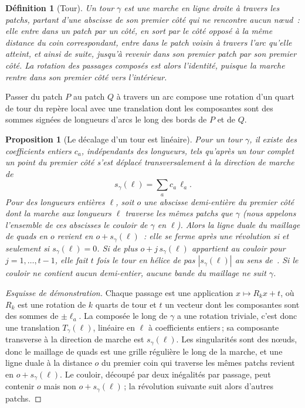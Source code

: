 \documentclass[11pt,a4paper]{article}
\newtheorem{definition}{Définition}
\newtheorem{proposition}{Proposition}
\newcommand{\shift}{s}
\begin{document}
\begin{definition}[Tour]
Un \emph{tour} $\gamma$ est une marche en ligne droite à travers les patchs,
partant d'une abscisse de son premier côté qui ne rencontre aucun nœud~: elle
entre dans un patch par un côté, en sort par le côté opposé à la même distance
du coin correspondant, entre dans le patch voisin à travers l'arc qu'elle
atteint, et ainsi de suite, jusqu'à revenir dans son premier patch par son
premier côté. La rotation des passages composés est alors l'identité,
puisque la marche rentre dans son premier côté vers l'intérieur.
\end{definition}

Passer du patch $P$ au patch $Q$ à travers un arc compose une rotation d'un
quart de tour du repère local avec une translation dont les composantes sont
des sommes signées de longueurs d'arcs le long des bords de $P$ et de $Q$.

\begin{proposition}[Le décalage d'un tour est linéaire]\label{prop:linear}
Pour un tour $\gamma$, il existe des coefficients entiers $c_a$, indépendants
des longueurs, tels qu'après un tour complet un point du premier côté s'est
déplacé transversalement à la direction de marche de
\[
  \shift_\gamma(\ell) = \sum_a c_a\, \ell_a .
\]
Pour des longueurs entières $\ell$, soit $o$ une abscisse demi-entière du
premier côté dont la marche aux longueurs $\ell$ traverse les mêmes patchs que
$\gamma$ (nous appelons l'ensemble de ces abscisses le \emph{couloir} de
$\gamma$ en $\ell$). Alors la ligne duale du maillage de quads en $o$ revient
en $o + \shift_\gamma(\ell)$~: elle se ferme après une révolution si et
seulement si $\shift_\gamma(\ell) = 0$. Si de plus $o + j\,\shift_\gamma(\ell)$
appartient au couloir pour $j = 1, \dots, t - 1$, elle fait $t$ fois le tour
en hélice de pas $|\shift_\gamma(\ell)|$ au sens
de~\cite{bommes2011structure}. Si le couloir ne contient aucun demi-entier,
aucune bande du maillage ne suit $\gamma$.
\end{proposition}

\begin{proof}[Esquisse de démonstration]
Chaque passage est une application $x \mapsto R_k x + t$, où $R_k$ est une
rotation de $k$ quarts de tour et $t$ un vecteur dont les composantes sont des
sommes de $\pm\ell_a$. La composée le long de $\gamma$ a une rotation
triviale, c'est donc une translation $T_\gamma(\ell)$, linéaire en $\ell$ à
coefficients entiers\,; sa composante transverse à la direction de marche est
$\shift_\gamma(\ell)$. Les singularités sont des nœuds, donc le maillage de
quads est une grille régulière le long de la marche, et une ligne duale à la
distance $o$ du premier coin qui traverse les mêmes patchs revient en $o +
\shift_\gamma(\ell)$. Le couloir, découpé par deux inégalités par passage,
peut contenir $o$ mais non $o + \shift_\gamma(\ell)$\,; la révolution
suivante suit alors d'autres patchs.
\end{proof}
\end{document}
